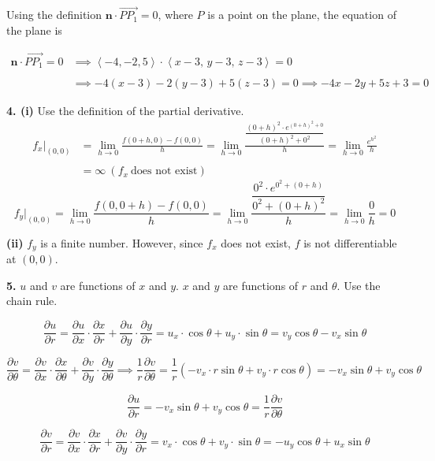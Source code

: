 \documentclass{article}
\begin{document}
Using the definition $\mathbf{n}\cdot\overrightarrow{PP_1}=0$, where $P$ is a point on the plane, the equation of the plane is

\begin{align*}\mathbf{n}\cdot\overrightarrow{PP_1}=0&\implies\left\langle-4,-2,5\right\rangle\cdot\left\langle x-3,\,y-3,\,z-3\right\rangle=0\\\\&\implies-4(x-3)-2(y-3)+5(z-3)=0\implies\boxed{-4x-2y+5z+3=0}\end{align*}

\vspace{1em}

\textbf{4. (i)} Use the definition of the partial derivative.
\begin{align*}f_x|_{(0,0)}&=\lim_{h\to0}\frac{f(0+h,0)-f(0,0)}h=\lim_{h\to0}\frac{\dfrac{(0+h)^2\cdot{e}^{(0+h)^2+0}}{(0+h)^2+0^2}}{h}=\lim_{h\to0}\frac{{e}^{h^2}}{h}\\\\&=\infty\:(f_x\:\text{does not exist})\end{align*}
\[f_y|_{(0,0)}=\lim_{h\to0}\frac{f(0,0+h)-f(0,0)}h=\lim_{h\to0}\frac{\dfrac{0^2\cdot{e}^{0^2+(0+h)}}{0^2+(0+h)^2}}{h}=\lim_{h\to0}\frac{0}{h}=0\]

\textbf{(ii)} $f_y$ is a finite number. However, since $f_x$ does not exist, $f$ is not differentiable at $(0,0)$.

\vspace{1em}

\textbf{5.} $u$ and $v$ are functions of $x$ and $y$. $x$ and $y$ are functions of $r$ and $\theta$. Use the chain rule.

\[\frac{\partial u}{\partial r}=\frac{\partial u}{\partial x}\cdot\frac{\partial x}{\partial r}+\frac{\partial u}{\partial y}\cdot\frac{\partial y}{\partial r}=u_x\cdot\cos\theta+u_y\cdot\sin\theta=v_y\cos\theta-v_x\sin\theta\]

\[\frac{\partial v}{\partial\theta}=\frac{\partial v}{\partial x}\cdot\frac{\partial x}{\partial\theta}+\frac{\partial v}{\partial y}\cdot\frac{\partial y}{\partial\theta}\implies\frac1r\frac{\partial v}{\partial\theta}=\frac1r\left(-v_x\cdot r\sin\theta+v_y\cdot r\cos\theta\right)=-v_x\sin\theta+v_y\cos\theta\]

\[\frac{\partial u}{\partial r}=-v_x\sin\theta+v_y\cos\theta=\frac1r\frac{\partial v}{\partial\theta}\]

\[\frac{\partial v}{\partial r}=\frac{\partial v}{\partial x}\cdot\frac{\partial x}{\partial r}+\frac{\partial v}{\partial y}\cdot\frac{\partial y}{\partial r}=v_x\cdot\cos\theta+v_y\cdot\sin\theta=-u_y\cos\theta+u_x\sin\theta\]
\end{document}
